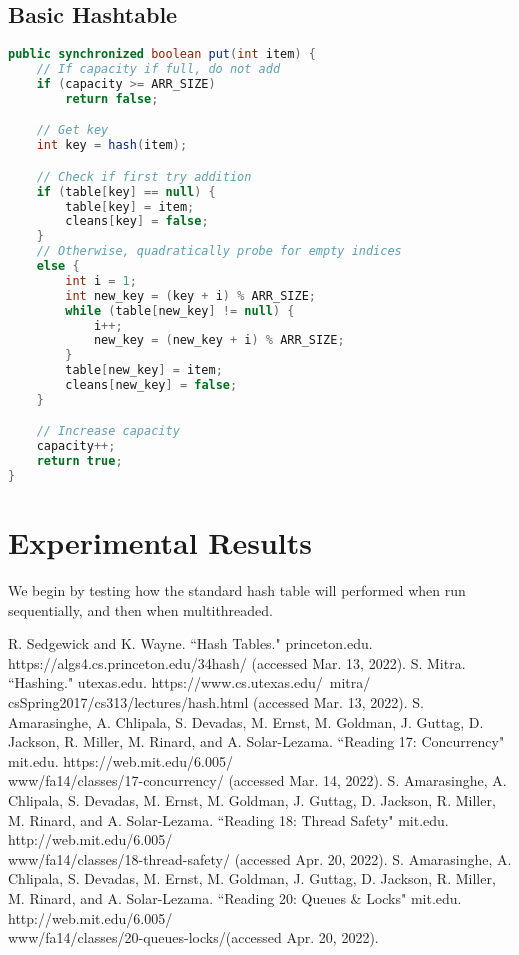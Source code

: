 \documentclass[conference]{IEEEtran}
\begin{document}
\subsection{Basic Hashtable}
\begin{lstlisting}[language={Java},caption=Source code for the course-grain put() method.,captionpos=b,breaklines=true,frame=single]
public synchronized boolean put(int item) {
    // If capacity if full, do not add
    if (capacity >= ARR_SIZE)
        return false;

    // Get key
    int key = hash(item);

    // Check if first try addition
    if (table[key] == null) {
        table[key] = item;
        cleans[key] = false;
    }
    // Otherwise, quadratically probe for empty indices
    else {
        int i = 1;
        int new_key = (key + i) % ARR_SIZE;
        while (table[new_key] != null) {
            i++;
            new_key = (new_key + i) % ARR_SIZE;
        }
        table[new_key] = item;
        cleans[new_key] = false;
    }

    // Increase capacity
    capacity++;
    return true;
}
\end{lstlisting}
\section{Experimental Results}
We begin by testing how the standard hash table will performed when run sequentially, and then when multithreaded.

\begin{thebibliography}{00}
 R. Sedgewick and K. Wayne. ``Hash Tables." princeton.edu. \\https://algs4.cs.princeton.edu/34hash/ (accessed Mar. 13, 2022).
 S. Mitra. ``Hashing." utexas.edu. https://www.cs.utexas.edu/~mitra/\\csSpring2017/cs313/lectures/hash.html (accessed Mar. 13, 2022).
 S. Amarasinghe, A. Chlipala, S. Devadas, M. Ernst, M. Goldman, J. Guttag, D. Jackson, R. Miller, M. Rinard, and A. Solar-Lezama. ``Reading 17: Concurrency"
mit.edu. https://web.mit.edu/6.005/\\www/fa14/classes/17-concurrency/ (accessed Mar. 14, 2022).
 S. Amarasinghe, A. Chlipala, S. Devadas, M. Ernst, M. Goldman, J. Guttag, D. Jackson, R. Miller, M. Rinard, and A. Solar-Lezama. ``Reading 18: Thread Safety"
mit.edu. http://web.mit.edu/6.005/\\www/fa14/classes/18-thread-safety/ (accessed Apr. 20, 2022).
 S. Amarasinghe, A. Chlipala, S. Devadas, M. Ernst, M. Goldman, J. Guttag, D. Jackson, R. Miller, M. Rinard, and A. Solar-Lezama. ``Reading 20: Queues \& Locks"
mit.edu. http://web.mit.edu/6.005/\\www/fa14/classes/20-queues-locks/(accessed Apr. 20, 2022).
\end{thebibliography}
\end{document}
